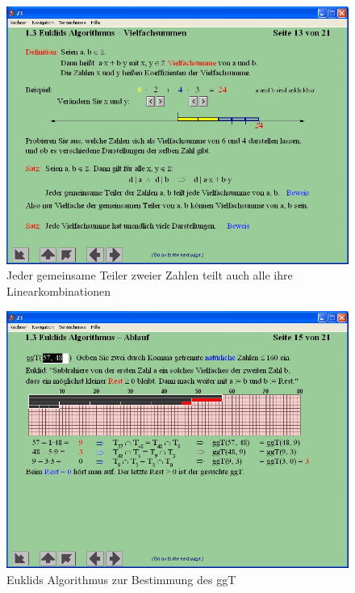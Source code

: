 \begin{refsegment}
%
%
\begin{figure}[ht]
\begin{center}
\includegraphics[scale=0.4]{figures/NT_Fig_C1-3_EuclidsAlg-LinearCombinations}
\caption{Jeder gemeinsame Teiler zweier Zahlen teilt auch alle ihre Linearkombinationen}
\label{NT_Fig_C1.3_EuclidsAlg-LinearCombinations}
\end{center}
\end{figure}


\begin{figure}[ht]
\begin{center}
\includegraphics[scale=0.4]{figures/NT_Fig_C1-3_EuclidsAlg-Procedure}
\caption{Euklids Algorithmus zur Bestimmung des ggT}
\label{NT_Fig_C1.3_EuclidsAlg-Procedure}
\end{center}
\end{figure}



\end{refsegment}
